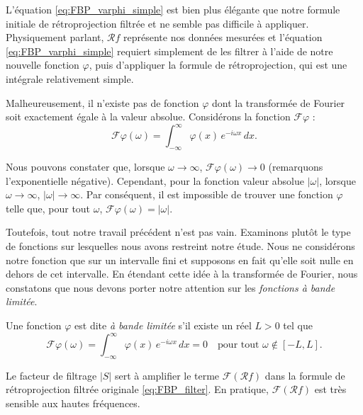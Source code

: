 L'équation \eqref{eq:FBP_varphi_simple} est bien plus élégante que notre formule initiale de rétroprojection filtrée et ne semble pas difficile à appliquer. Physiquement parlant, $\mathcal{R}f$ représente nos données mesurées et l'équation \eqref{eq:FBP_varphi_simple} requiert simplement de les filtrer à l'aide de notre nouvelle fonction $\varphi$, puis d'appliquer la formule de rétroprojection, qui est une intégrale relativement simple.

Malheureusement, il n'existe pas de fonction $\varphi$ dont la transformée de Fourier
soit exactement égale à la valeur absolue. Considérons la fonction $\mathcal{F}\varphi$ :
\begin{equation}
\mathcal{F}\varphi(\omega)
=
\int_{-\infty}^{\infty}
\varphi(x)\,e^{-i\omega x}\,dx.
\end{equation}

Nous pouvons constater que, lorsque $\omega \to \infty$,
$\mathcal{F}\varphi(\omega) \to 0$ (remarquons l'exponentielle négative).
Cependant, pour la fonction valeur absolue $|\omega|$, lorsque $\omega \to \infty$,
$|\omega| \to \infty$.
Par conséquent, il est impossible de trouver une fonction $\varphi$ telle que,
pour tout $\omega$, $\mathcal{F}\varphi(\omega) = |\omega|$.

Toutefois, tout notre travail précédent n'est pas vain. Examinons plutôt le type de
fonctions sur lesquelles nous avons restreint notre étude. Nous ne considérons notre
fonction que sur un intervalle fini et supposons en fait qu'elle soit nulle en dehors
de cet intervalle. En étendant cette idée à la transformée de Fourier, nous constatons
que nous devons porter notre attention sur les \emph{fonctions à bande limitée}.

\begin{definition}
    Une fonction $\varphi$ est dite \emph{à bande limitée} s'il existe un réel $L > 0$ tel que
    \begin{equation}
        \mathcal{F}\varphi(\omega)
        =
        \int_{-\infty}^{\infty}
        \varphi(x)\,e^{-i\omega x}\,dx
        =
        0
        \quad \text{pour tout } \omega \notin [-L, L].
        \label{eq:FBP_varphi_banded}
    \end{equation}
\end{definition}

Le facteur de filtrage $|S|$ sert à amplifier le terme $\mathcal{F}(\mathcal{R}f)$ dans la formule de rétroprojection filtrée originale \eqref{eq:FBP_filter}. En pratique, $\mathcal{F}(\mathcal{R}f)$ est très sensible aux hautes fréquences.

